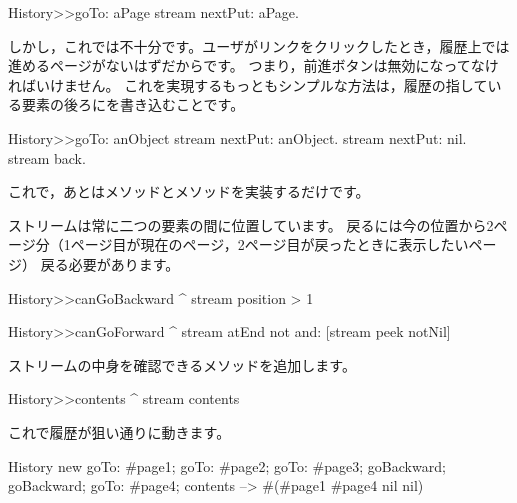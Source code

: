 \documentclass[a4paper,10pt,twoside]{book}
\begin{document}
{\begin{code}{}
History>>goTo: aPage
    stream nextPut: aPage.
\end{code}

しかし，これでは不十分です。ユーザがリンクをクリックしたとき，履歴上では進めるページがないはずだからです。
つまり，前進ボタンは無効になってなければいけません。
これを実現するもっともシンプルな方法は，履歴の指している要素の後ろにを書き込むことです。


\begin{code}{}
History>>goTo: anObject
  stream nextPut: anObject.
  stream nextPut: nil.
  stream back.
\end{code}

これで，あとはメソッドとメソッドを実装するだけです。

ストリームは常に二つの要素の間に位置しています。
戻るには今の位置から2ページ分（1ページ目が現在のページ，2ページ目が戻ったときに表示したいページ）
戻る必要があります。


\begin{code}{}
History>>canGoBackward
  ^ stream position > 1

History>>canGoForward
  ^ stream atEnd not and: [stream peek notNil]
\end{code}

ストリームの中身を確認できるメソッドを追加します。

\begin{code}{}
History>>contents
  ^ stream contents
\end{code}

これで履歴が狙い通りに動きます。

\begin{code}{}
History new
	goTo: #page1;
	goTo: #page2;
	goTo: #page3;
	goBackward;
	goBackward;
	goTo: #page4;
	contents --> #(#page1 #page4 nil nil)
\end{code}

}
\end{document}
